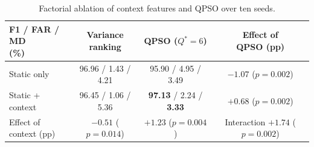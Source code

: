 \documentclass[conference]{IEEEtran}
\begin{document}
\begin{table}[!t]
\centering
\scriptsize
\caption{Factorial ablation of context features and QPSO over ten seeds.}
\label{tab:centralized_compare}
\setlength{\tabcolsep}{3pt}
\begin{tabular}{lccc}
\hline\toprule
\makecell[l]{F1 / FAR / MD\\(\%)} & \makecell{Variance\\ranking} & \makecell{QPSO\\($Q^{*}{=}6$)} & \makecell{Effect of\\QPSO (pp)} \\
\hline\toprule
Static only & 96.96 / 1.43 / 4.21 & 95.90 / 4.95 / 3.49 & \makecell{$-1.07$\\($p{=}0.002$)} \\
\makecell[l]{Static +\\context} & 96.45 / 1.06 / 5.36 & \textbf{97.13} / 2.24 / \textbf{3.33} & \makecell{$+0.68$\\($p{=}0.002$)} \\
\midrule
\makecell[l]{Effect of\\context (pp)} & \makecell{$-0.51$\\($p{=}0.014$)} & \makecell{$+1.23$\\($p{=}0.004$)} & \makecell{Interaction\\$+1.74$\\($p{=}0.002$)} \\
\hline\toprule
\end{tabular}
\end{table}
\end{document}

